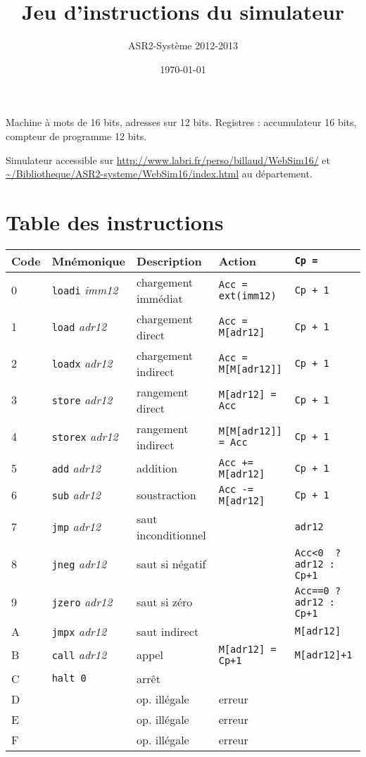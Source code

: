 \documentclass[11pt]{article}
\title{Jeu d'instructions du simulateur}
\author{ASR2-Système 2012-2013}
\date{\today}
\begin{document}
\maketitle

Machine à mots de 16 bits, adresses sur 12 bits. 
Registres : accumulateur 16 bits, compteur de programme 12 bits.

Simulateur accessible sur
\url{http://www.labri.fr/perso/billaud/WebSim16/}
et  \url{~/Bibliotheque/ASR2-systeme/WebSim16/index.html} au département.


\section{Table des instructions}



\begin{center}
\begin{tabular}{|lllll|}
\hline
Code & Mnémonique &  Description & Action & \texttt{Cp = } \\
\hline
0 & \texttt{loadi} \emph{imm12} &  chargement immédiat &  \verb/Acc = ext(imm12)/ & \verb/Cp + 1/\\
1 & \texttt{load} \emph{adr12} &  chargement direct &  \verb/Acc = M[adr12]/ & \verb/Cp + 1/ \\
2 & \texttt{loadx} \emph{adr12} &  chargement indirect &  \verb/Acc = M[M[adr12]]/& \verb/Cp + 1/ \\
3 & \texttt{store} \emph{adr12} &  rangement direct &  \verb/M[adr12] = Acc/ & \verb/Cp + 1/ \\
4 & \texttt{storex} \emph{adr12} &  rangement indirect &  \verb/M[M[adr12]] = Acc/& \verb/Cp + 1/ \\
\hline
5 & \texttt{add} \emph{adr12} & addition & \verb/Acc += M[adr12]/ & \verb/Cp + 1/ \\
6 & \texttt{sub} \emph{adr12} & soustraction & \verb/Acc -= M[adr12]/ & \verb/Cp + 1/ \\
\hline
7 & \texttt{jmp} \emph{adr12}  & saut inconditionnel & &\verb/adr12/  \\
8 & \texttt{jneg} \emph{adr12}  & saut si négatif & & \verb/Acc<0  ? adr12 : Cp+1/ \\
9 & \texttt{jzero} \emph{adr12}  & saut si zéro & & \verb/Acc==0 ? adr12 : Cp+1/ \\
\hline
A & \texttt{jmpx} \emph{adr12}  & saut indirect & & \verb/M[adr12]/ \\
B & \texttt{call} \emph{adr12}  & appel & \verb/M[adr12] = Cp+1/ & \verb/M[adr12]+1 / \\
\hline
C & \texttt{halt 0}  & arrêt & &  \\
\hline
D & & op. illégale & erreur &   \\
E & & op. illégale & erreur &   \\
F & & op. illégale & erreur &  \\
\hline
\end{tabular}
\end{center}
\end{document}
